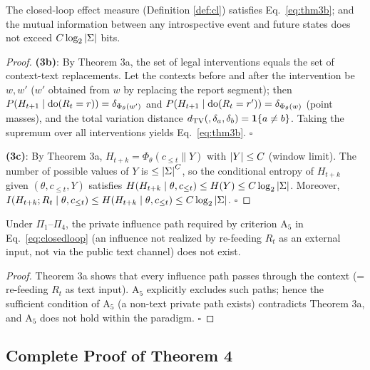 \begin{restate}[Theorems 3b/3c]
The closed-loop effect measure (Definition \ref{def:cl}) satisfies
Eq.~\eqref{eq:thm3b}; and the mutual information between any introspective event and future
states does not exceed $C \log_2 \left\lvert \Sigma \right\rvert$ bits.
\end{restate}

\begin{proof}
\textbf{(3b)}: By Theorem 3a, the set of legal interventions equals the set of context-text
replacements. Let the contexts before and after the intervention be $w, w'$ ($w'$ obtained
from $w$ by replacing the report segment); then
$P(H_{t+1} \mid \operatorname{do}(R_t = r)) = \delta_{\Phi_\theta(w')}$ and
$P(H_{t+1} \mid \operatorname{do}(R_t = r')) = \delta_{\Phi_\theta(w)}$ (point masses), and the total
variation distance $d_{\mathrm{TV}}\!\left(,\delta_a, \delta_b\right) = \mathbf{1}\{a \ne b\}$. Taking the supremum
over all interventions yields Eq.~\eqref{eq:thm3b}. $\square$

\textbf{(3c)}: By Theorem 3a, $H_{t+k} = \Phi_\theta(c_{\le t} \| Y)$ with $\left\lvert Y \right\rvert \le C$
(window limit). The number of possible values of $Y$ is $\le \left\lvert \Sigma \right\rvert^{C}$, so the
conditional entropy of $H_{t+k}$ given $(\theta, c_{\le t}, Y)$ satisfies
$H(H_{t+k} \mid \theta, c_{\le t}) \le H(Y) \le C \log_2 \left\lvert \Sigma \right\rvert$.
Moreover, $I(H_{t+k}; R_t \mid \theta, c_{\le t}) \le H(H_{t+k} \mid \theta, c_{\le t})
\le C\log_2\left\lvert \Sigma \right\rvert$. $\square$
\end{proof}

\begin{restatecor}
Under $\Pi_1$--$\Pi_4$, the private influence path required by criterion $\mathrm{A}_5$ in
Eq.~\eqref{eq:closedloop} (an influence not realized by re-feeding $R_t$ as an external
input, not via the public text channel) does not exist.
\end{restatecor}

\begin{proof}
Theorem 3a shows that every influence path passes through the context (= re-feeding $R_t$ as
text input). $\mathrm{A}_5$ explicitly excludes such paths; hence the sufficient condition of
$\mathrm{A}_5$ (a non-text private path exists) contradicts Theorem 3a, and $\mathrm{A}_5$
does not hold within the paradigm. $\square$
\end{proof}

\subsection{Complete Proof of Theorem 4}

